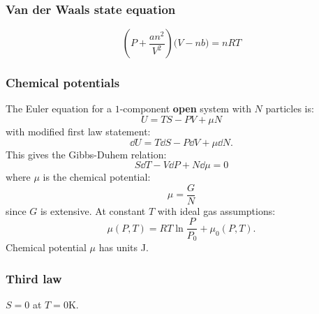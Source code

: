 \documentclass{article}
\begin{document}
\begin{multicols*}{3}
\subsubsection*{Van der Waals state equation}
$$\left(P+\frac{an^2}{V^2}\right)
\bigl(V-nb\bigr)=nRT$$

\subsubsection*{Chemical potentials}
The Euler equation for a $1$-component
\textbf{open} system with
$N$ particles is:
$$U=TS-PV+\mu N$$
with modified first law statement: 
$$\dd U
=T\dd S-P\dd V+\mu\dd N.$$
This gives the Gibbs-Duhem relation:
$$S\dd T-V\dd P+N\dd\mu=0$$
where $\mu$ is the chemical potential:
$$\mu=\frac{G}{N}$$
since $G$ is extensive. At constant $T$
with ideal gas assumptions:
$$\mu(P,T)=RT\ln\frac{P}{P_0}+\mu_0(P,T).$$
Chemical potential $\mu$ has units J.

\subsubsection*{Third law}
$S=0$ at $T=0$K.

\end{multicols*}
\end{document}

